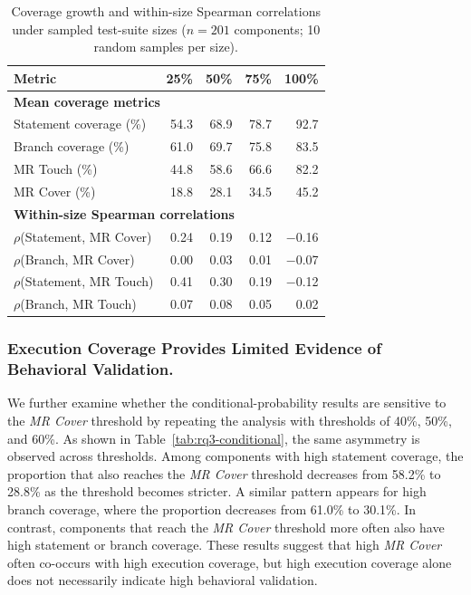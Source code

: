 \begin{table}[h]
\centering
\caption{Coverage growth and within-size Spearman correlations under sampled test-suite sizes ($n=201$ components; 10 random samples per size).}
\label{tab:rq3-merged}
\small
\setlength{\tabcolsep}{4pt}
\begin{tabular}{lrrrr}
\toprule
\textbf{Metric} & \textbf{25\%} & \textbf{50\%} & \textbf{75\%} & \textbf{100\%} \\
\midrule
\multicolumn{5}{l}{\textbf{Mean coverage metrics}} \\
Statement coverage (\%) & 54.3 & 68.9 & 78.7 & 92.7 \\
Branch coverage (\%)    & 61.0 & 69.7 & 75.8 & 83.5 \\
MR Touch (\%)           & 44.8 & 58.6 & 66.6 & 82.2 \\
MR Cover (\%)           & 18.8 & 28.1 & 34.5 & 45.2 \\
\midrule
\multicolumn{5}{l}{\textbf{Within-size Spearman correlations}} \\
$\rho$(Statement, MR Cover) & 0.24 & 0.19 & 0.12 & $-$0.16 \\
$\rho$(Branch, MR Cover)    & 0.00 & 0.03 & 0.01 & $-$0.07 \\
$\rho$(Statement, MR Touch) & 0.41 & 0.30 & 0.19 & $-$0.12 \\
$\rho$(Branch, MR Touch)    & 0.07 & 0.08 & 0.05 & 0.02 \\
\bottomrule
\end{tabular}
\end{table}


\subsubsection{Execution Coverage Provides Limited Evidence of Behavioral Validation.} 
We further examine whether the conditional-probability results are sensitive to the \textit{MR Cover} threshold by repeating the analysis with thresholds of 40\%, 50\%, and 60\%. As shown in Table~\ref{tab:rq3-conditional}, the same asymmetry is observed across thresholds. Among components with high statement coverage, the proportion that also reaches the \textit{MR Cover} threshold decreases from 58.2\% to 28.8\% as the threshold becomes stricter. A similar pattern appears for high branch coverage, where the proportion decreases from 61.0\% to 30.1\%. In contrast, components that reach the \textit{MR Cover} threshold more often also have high statement or branch coverage. These results suggest that high \textit{MR Cover} often co-occurs with high execution coverage, but high execution coverage alone does not necessarily indicate high behavioral validation.

